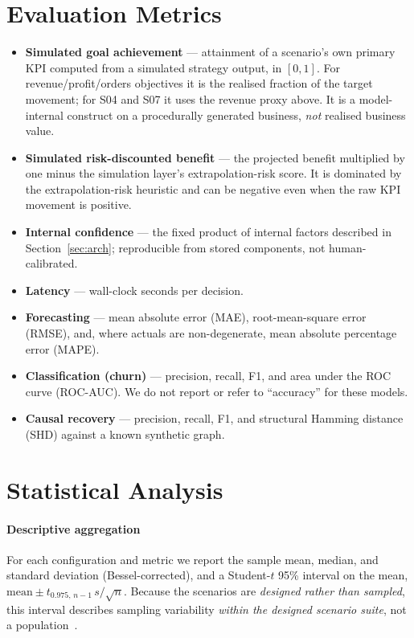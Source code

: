 \documentclass[conference]{IEEEtran}
\begin{document}
\section{Evaluation Metrics}
\label{sec:metrics}

\begin{itemize}
\item \textbf{Simulated goal achievement} --- attainment of a scenario's own
primary KPI computed from a simulated strategy output, in $[0,1]$. For
revenue/profit/orders objectives it is the realised fraction of the target
movement; for S04 and S07 it uses the revenue proxy above. It is a
model-internal construct on a procedurally generated business, \emph{not}
realised business value.
\item \textbf{Simulated risk-discounted benefit} --- the projected benefit
multiplied by one minus the simulation layer's extrapolation-risk score. It is
dominated by the extrapolation-risk heuristic and can be negative even when the
raw KPI movement is positive.
\item \textbf{Internal confidence} --- the fixed product of internal factors
described in Section~\ref{sec:arch}; reproducible from stored components, not
human-calibrated.
\item \textbf{Latency} --- wall-clock seconds per decision.
\item \textbf{Forecasting} --- mean absolute error (MAE), root-mean-square
error (RMSE), and, where actuals are non-degenerate, mean absolute percentage
error (MAPE).
\item \textbf{Classification (churn)} --- precision, recall, F1, and area under
the ROC curve (ROC-AUC). We do not report or refer to ``accuracy'' for these
models.
\item \textbf{Causal recovery} --- precision, recall, F1, and structural
Hamming distance (SHD) against a known synthetic graph.
\end{itemize}

\section{Statistical Analysis}
\label{sec:stats}

\paragraph{Descriptive aggregation}
For each configuration and metric we report the sample mean, median, and
standard deviation (Bessel-corrected), and a Student-$t$ 95\% interval on the
mean, $\text{mean} \pm t_{0.975,\,n-1}\, s/\sqrt{n}$. Because the scenarios are
\emph{designed rather than sampled}, this interval describes sampling
variability \emph{within the designed scenario suite}, not a
population~\cite{Shadish2002,Wasserstein2016}.
\end{document}
